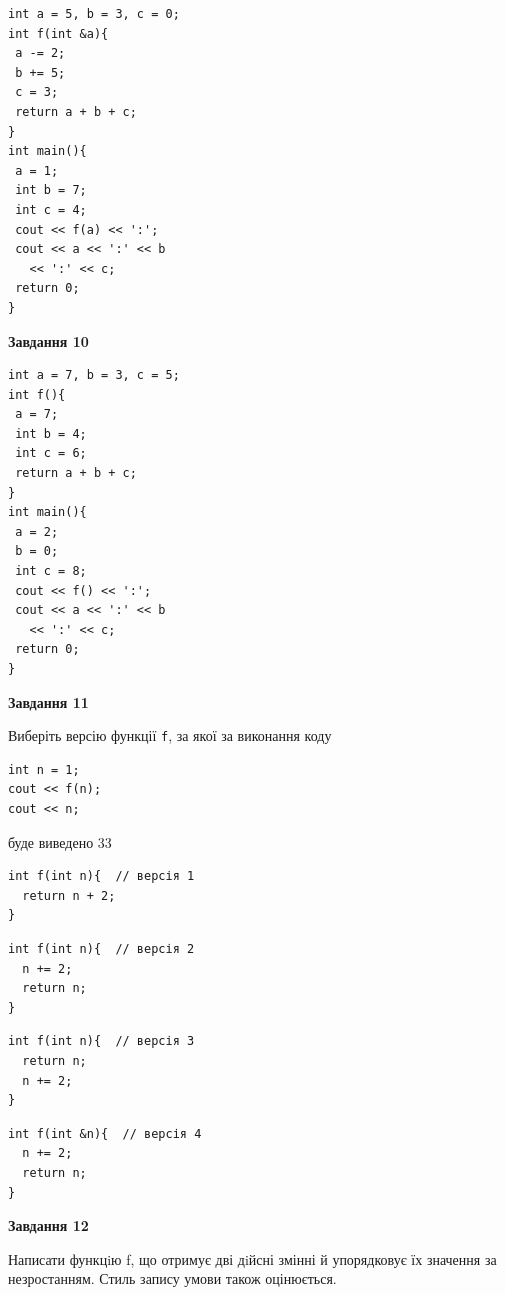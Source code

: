 \documentclass[12pt, ukrainian]{article}
\def\code#1{\Verb!#1!}
\begin{document}
{\begin {large}
\begin{minipage}[t]{7.0cm}
\begin{verbatim}
int a = 5, b = 3, c = 0;
int f(int &a){
 a -= 2;
 b += 5;
 c = 3;
 return a + b + c;
}
int main(){
 a = 1;
 int b = 7;
 int c = 4;
 cout << f(a) << ':';
 cout << a << ':' << b 
   << ':' << c;
 return 0;
}
\end{verbatim}



\begin{center}
\textbf{Завдання 10}
\end{center}
\vspace{-8mm}

\begin{verbatim}
int a = 7, b = 3, c = 5;
int f(){
 a = 7;
 int b = 4;
 int c = 6;
 return a + b + c;
}
int main(){
 a = 2;
 b = 0;
 int c = 8;
 cout << f() << ':';
 cout << a << ':' << b 
   << ':' << c;
 return 0;
}
\end{verbatim}

\end{minipage}
\vline \hspace{1mm}
\begin{minipage}[t]{11.0cm}

\begin{center}
\textbf{Завдання 11}
\end{center}
Виберіть версію функції \code{f}, за якої за виконання коду
\begin{verbatim}
int n = 1;
cout << f(n);
cout << n;
\end{verbatim}

буде виведено 33

\begin{verbatim}
int f(int n){  // версія 1
  return n + 2;
}
\end{verbatim}

\vspace{-8mm}\begin{verbatim}
int f(int n){  // версія 2
  n += 2;
  return n;
}
\end{verbatim}

\vspace{-8mm}\begin{verbatim}
int f(int n){  // версія 3
  return n;
  n += 2;
}
\end{verbatim}

\vspace{-8mm}\begin{verbatim}
int f(int &n){  // версія 4
  n += 2;
  return n;
}
\end{verbatim}



\begin{center}
\textbf{Завдання 12}
\end{center}

Написати функцiю f, що отримує дві дiйсні змінні й упорядковує їх значення за незростанням. Стиль запису умови також оцінюється.\par

\end{minipage}

\end {large}}
\newpage
\end{document}
